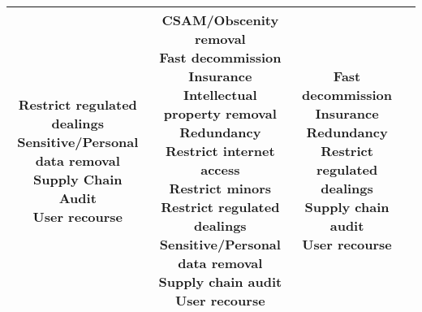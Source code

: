 \documentclass[fleqn]{article}
\begin{document}
\begin{landscape}
\begin{table}[H]
\begin{tabular}{|c|c|c|c|}
{			\textbullet\hspace{3pt} Restrict regulated dealings \\ 	
			\textbullet\hspace{3pt} Sensitive/Personal data removal \\ 	
			\textbullet\hspace{3pt} Supply Chain Audit \\ 	
			\textbullet\hspace{3pt} User recourse \\ 		 	 	 
		}
		& \makecell[l]{
			\textbullet\hspace{3pt} CSAM/Obscenity removal \\ 	
			\textbullet\hspace{3pt} Fast decommission \\ 	
			\textbullet\hspace{3pt} Insurance \\ 	
			\textbullet\hspace{3pt} Intellectual property removal \\ 	
			\textbullet\hspace{3pt} Redundancy \\ 	
			\textbullet\hspace{3pt} Restrict internet access \\ 	
			\textbullet\hspace{3pt} Restrict minors \\ 	
			\textbullet\hspace{3pt} Restrict regulated dealings \\ 	
			\textbullet\hspace{3pt} Sensitive/Personal data removal \\ 	
			\textbullet\hspace{3pt} Supply chain audit \\ 	
			\textbullet\hspace{3pt} User recourse \\					 	 
		}
		& \makecell[l]{
			\textbullet\hspace{3pt} Fast decommission \\ 	
			\textbullet\hspace{3pt} Insurance \\ 	
			\textbullet\hspace{3pt} Redundancy \\ 	
			\textbullet\hspace{3pt} Restrict regulated dealings \\ 	
			\textbullet\hspace{3pt} Supply chain audit \\ 	
			\textbullet\hspace{3pt} User recourse \\  					 	 
		}
		\\
		\hline
	\end{tabular}
	\label{table:high_risk_plan_by_tc_cont}
\end{table}


\end{landscape}
\end{document}
